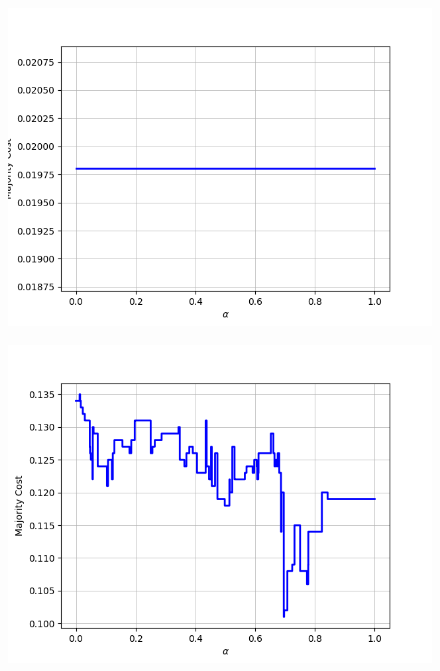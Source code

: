 \begin{figure}[h]
\begin{minipage}{.24\textwidth}
  {\includegraphics[width=\linewidth]{plots/nell-ac/invertebrate}}
\end{minipage}
\begin{minipage}{.24\textwidth}
  \centering
  {\includegraphics[width=\linewidth]{plots/nell-ac/location}}
\end{minipage}
\end{figure}
